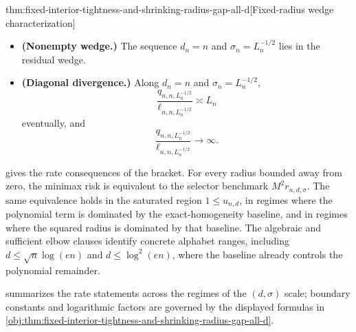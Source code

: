 \begin{theoremv}{thm:fixed-interior-tightness-and-shrinking-radius-gap-all-d}[Fixed-radius wedge characterization]
\begin{itemize}
\[
\frac{r_{n,d_n,\sigma_n}}
{n^{-1}+\min\{1,d_n/n^2\}+\sigma_n^2\min\{1,u_{n,d_n}\}}
\to\infty,
\]
then the sequence lies in the residual wedge:
\[
\frac{b_{n,d_n}}{u_{n,d_n}}\to0,
\qquad
u_{n,d_n}\to0,
\qquad
\frac{b_{n,d_n}}{\sigma_n^2}\to0,
\qquad
\sigma_n^2\to0.
\]
\item \textbf{(Nonempty wedge.)} The sequence \(d_n=n\) and \(\sigma_n=L_n^{-1/2}\) lies in the residual wedge.
\item \textbf{(Diagonal divergence.)} Along \(d_n=n\) and \(\sigma_n=L_n^{-1/2}\),
\[
\frac{q_{n,n,L_n^{-1/2}}}{\ell_{n,n,L_n^{-1/2}}}
\asymp L_n
\]
eventually, and
\[
\frac{q_{n,n,L_n^{-1/2}}}{\ell_{n,n,L_n^{-1/2}}}\to\infty .
\]
\end{itemize}
\end{theoremv}

 gives the rate consequences of the bracket. For every radius bounded away from zero, the minimax risk is equivalent to the selector benchmark \(M^2r_{n,d,\sigma}\). The same equivalence holds in the saturated region \(1\le u_{n,d}\), in regimes where the polynomial term is dominated by the exact-homogeneity baseline, and in regimes where the squared radius is dominated by that baseline. The algebraic and sufficient elbow clauses identify concrete alphabet ranges, including \(d\le \sqrt n\log(en)\) and \(d\le \log^2(en)\), where the baseline already controls the polynomial remainder.

 summarizes the rate statements across the regimes of the \((d,\sigma)\) scale; boundary constants and logarithmic factors are governed by the displayed formulas in \cref{obj:thm:fixed-interior-tightness-and-shrinking-radius-gap-all-d}.


